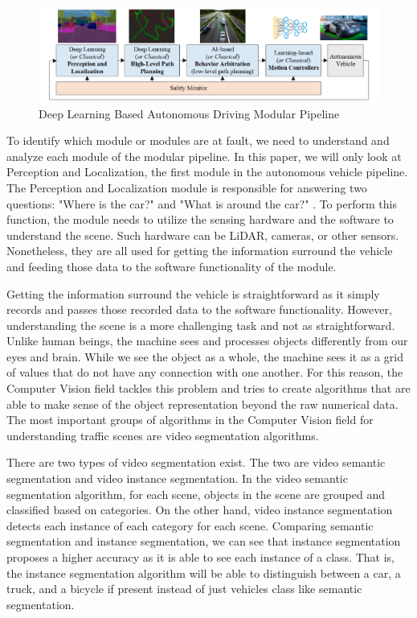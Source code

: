 \begin{figure}[!ht] \centering
    \includegraphics[keepaspectratio=true,width=6in]{figures/autonomous_driving_modular_pipeline.png}
    \caption{Deep Learning Based Autonomous Driving Modular Pipeline \cite{grigorescu_trasnea_cocias_macesanu_2020}}
    \label{fig:autonomous_driving_pipeline}
\end{figure}

To identify which module or modules are at fault, we need to understand and analyze each module of the modular pipeline. In this paper, we will only look at Perception and Localization, the first module in the autonomous vehicle pipeline. The Perception and Localization module is responsible for answering two questions: "Where is the car?" and "What is around the car?" \cite{liu_2020}. To perform this function, the module needs to utilize the sensing hardware and the software to understand the scene. Such hardware can be LiDAR, cameras, or other sensors. Nonetheless, they are all used for getting the information surround the vehicle and feeding those data to the software functionality of the module.

Getting the information surround the vehicle is straightforward as it simply records and passes those recorded data to the software functionality. However, understanding the scene is a more challenging task and not as straightforward. Unlike human beings, the machine sees and processes objects differently from our eyes and brain. While we see the object as a whole, the machine sees it as a grid of values that do not have any connection with one another. For this reason, the Computer Vision field tackles this problem and tries to create algorithms that are able to make sense of the object representation beyond the raw numerical data. The most important groups of algorithms in the Computer Vision field for understanding traffic scenes are video segmentation algorithms.

There are two types of video segmentation exist. The two are video semantic segmentation and video instance segmentation. In the video semantic segmentation algorithm, for each scene, objects in the scene are grouped and classified based on categories. On the other hand, video instance segmentation detects each instance of each category for each scene. Comparing semantic segmentation and instance segmentation, we can see that instance segmentation proposes a higher accuracy as it is able to see each instance of a class. That is, the instance segmentation algorithm will be able to distinguish between a car, a truck, and a bicycle if present instead of just vehicles class like semantic segmentation.


